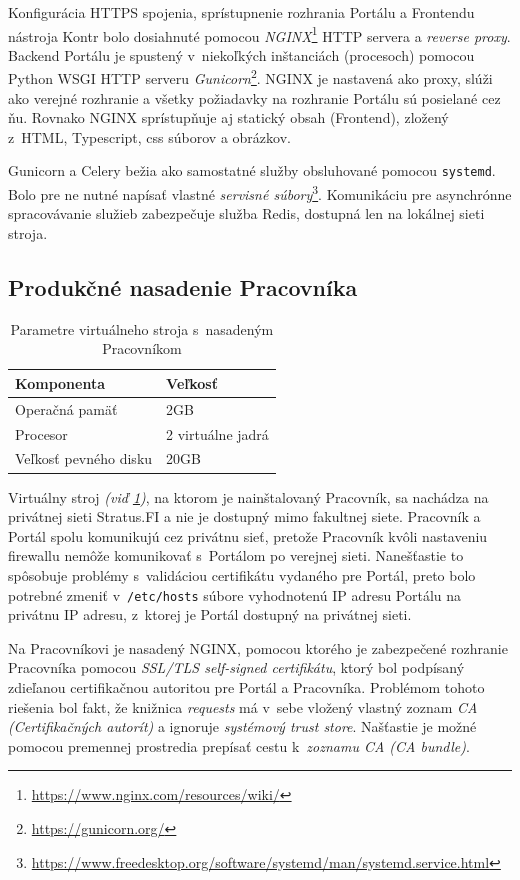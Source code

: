 \documentclass[
  digital, %
  oneside, %
  table,   %
  lof,     %
  lot,   %
]{fithesis3}
\newcommand*{\footurl}[1]{\footnote{\url{#1}}}
\begin{document}
Konfigurácia HTTPS spojenia, sprístupnenie rozhrania Portálu a Frontendu nástroja Kontr bolo dosiahnuté pomocou \textit{NGINX}\footnote{\url{https://www.nginx.com/resources/wiki/}} HTTP servera a \emph{reverse proxy}. Backend Portálu je spustený v~niekoľkých inštanciách (procesoch) pomocou Python WSGI HTTP serveru \emph{Gunicorn}\footurl{https://gunicorn.org/}. NGINX je nastavená ako proxy, slúži ako verejné rozhranie a všetky požiadavky na rozhranie Portálu sú posielané cez ňu. Rovnako NGINX sprístupňuje aj statický obsah (Frontend), zložený z~HTML, Typescript, css súborov a obrázkov.

Gunicorn a Celery bežia ako samostatné služby obsluhované pomocou \texttt{systemd}. Bolo pre ne nutné napísať vlastné \emph{servisné súbory}\footnote{\url{https://www.freedesktop.org/software/systemd/man/systemd.service.html}}. Komunikáciu pre asynchrónne spracovávanie služieb zabezpečuje služba Redis, dostupná len na lokálnej sieti stroja.

\subsection{Produkčné nasadenie Pracovníka}

\begin{table}[h]
\begin{tabular}{l l}
Komponenta & Veľkosť \\ [0.5ex] 
\hline
Operačná pamäť & 2GB  \\
Procesor & 2 virtuálne jadrá  \\
Veľkosť pevného disku&  20GB \\
\end{tabular}
\caption{Parametre virtuálneho stroja s~nasadeným Pracovníkom} \label{tab:machine-worker}
\end{table}

Virtuálny stroj \emph{(viď \ref{tab:machine-worker})}, na ktorom je nainštalovaný Pracovník, sa nachádza na privátnej sieti Stratus.FI a nie je dostupný mimo fakultnej siete. Pracovník a Portál spolu komunikujú cez privátnu sieť, pretože Pracovník kvôli nastaveniu firewallu nemôže komunikovať s~Portálom po verejnej sieti. Nanešťastie to spôsobuje problémy s~validáciou certifikátu vydaného pre Portál, preto bolo potrebné zmeniť v~\texttt{/etc/hosts} súbore vyhodnotenú IP adresu Portálu na privátnu IP adresu, z~ktorej je Portál dostupný na privátnej sieti.

Na Pracovníkovi je nasadený NGINX, pomocou ktorého je zabezpečené rozhranie Pracovníka pomocou \emph{SSL/TLS self-signed certifikátu}, ktorý bol podpísaný zdieľanou certifikačnou autoritou pre Portál a Pracovníka. Problémom tohoto riešenia bol fakt, že knižnica \emph{requests} má v~sebe vložený vlastný zoznam \emph{CA (Certifikačných autorít)}\cite{RFC5280} a ignoruje \emph{systémový trust store}. Našťastie je možné pomocou premennej prostredia prepísať cestu k~\emph{zoznamu CA (CA bundle)}.
\end{document}
